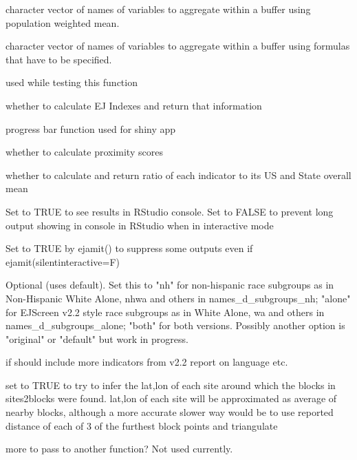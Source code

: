 \documentclass[a4paper]{book}
\begin{document}
\begin{Arguments}
\begin{ldescription}
\item[\code{popmeancols}] character vector of names of variables to aggregate within a buffer
using population weighted mean.

\item[\code{calculatedcols}] character vector of names of variables to aggregate within a buffer
using formulas that have to be specified.

\item[\code{testing}] used while testing this function

\item[\code{include\_ejindexes}] whether to calculate EJ Indexes and return that information

\item[\code{updateProgress}] progress bar function used for shiny app

\item[\code{need\_proximityscore}] whether to calculate proximity scores

\item[\code{calculate\_ratios}] whether to calculate and return ratio of each indicator to its US and State overall mean

\item[\code{silentinteractive}] Set to TRUE to see results in RStudio console.
Set to FALSE to prevent long output showing in console in RStudio when in interactive mode

\item[\code{called\_by\_ejamit}] Set to TRUE by ejamit() to suppress some outputs even if ejamit(silentinteractive=F)

\item[\code{subgroups\_type}] Optional (uses default). Set this to
"nh" for non-hispanic race subgroups as in Non-Hispanic White Alone, nhwa and others in names\_d\_subgroups\_nh;
"alone" for EJScreen v2.2 style race subgroups as in    White Alone, wa and others in names\_d\_subgroups\_alone;
"both" for both versions. Possibly another option is "original" or "default" but work in progress.

\item[\code{extra\_demog}] if should include more indicators from v2.2 report on language etc.

\item[\code{infer\_sitepoints}] set to TRUE to try to infer the lat,lon of each site around which the blocks in sites2blocks were found.
lat,lon of each site will be approximated as average of nearby blocks, although a more accurate slower way would
be to use reported distance of each of 3 of the furthest block points and triangulate

\item[\code{...}] more to pass to another function? Not used currently.
\end{ldescription}
\end{Arguments}
\end{document}
